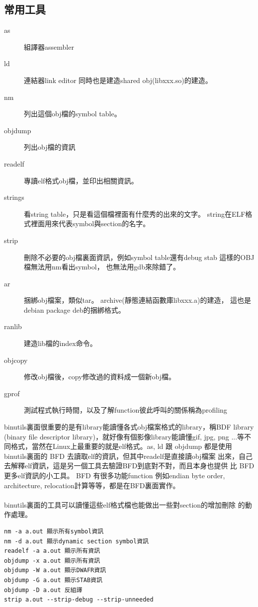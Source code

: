     \subsection{常用工具}
    \begin{description}
      \item [as] 組譯器assembler
      \item [ld] 連結器link editor 同時也是建造shared obj(libxxx.so)的建造。
      \item [nm] 列出這個obj檔的symbol table。
      \item [objdump] 列出obj檔的資訊
      \item [readelf] 專讀elf格式obj檔，並印出相關資訊。
      \item [strings] 看string table，只是看這個檔裡面有什麼秀的出來的文字。
           string在ELF格式裡面用來代表symbol與section的名字。
      \item [strip] 刪除不必要的obj檔裏面資訊，例如symbol table還有debug stab
          這樣的OBJ檔無法用nm看出symbol， 也無法用gdb來除錯了。
      \item [ar] 捆綁obj檔案，類似tar。 archive(靜態連結函數庫libxxx.a)的建造，
        這也是debian package deb的捆綁格式。
      \item [ranlib] 建造lib檔的index命令。
      \item [objcopy] 修改obj檔後，copy修改過的資料成一個新obj檔。
      \item [gprof] 測試程式執行時間，以及了解function彼此呼叫的關係稱為profiling
    \end{description}
    binutils裏面很重要的是有library能讀懂各式obj檔案格式的library，稱BDF library
    (binary file descriptor library)，就好像有個影像library能讀懂gif, jpg, png
    ...等不同格式，當然在Linux上最重要的就是elf格式。as, ld 跟 objdump 都是使用
    binutils裏面的 BFD 去讀取elf的資訊，但其中readelf是直接讀obj檔案
    出來，自己去解釋elf資訊，這是另一個工具去驗證BFD到底對不對，而且本身也提供
    比 BFD 更多elf資訊的小工具。 BFD 有很多功能function 例如endian byte order,
    architecture, relocation計算等等，都是在BFD裏面實作。
    \\\\
    binutils裏面的工具可以讀懂這些elf格式檔也能做出一些對section的增加刪除
    的動作處理。
    \begin{verbatim}
nm -a a.out 顯示所有symbol資訊
nm -d a.out 顯示dynamic section symbol資訊
readelf -a a.out 顯示所有資訊
objdump -x a.out 顯示所有資訊
objdump -W a.out 顯示DWAFR資訊 
objdump -G a.out 顯示STAB資訊
objdump -D a.out 反組譯
strip a.out --strip-debug --strip-unneeded
    \end{verbatim}
